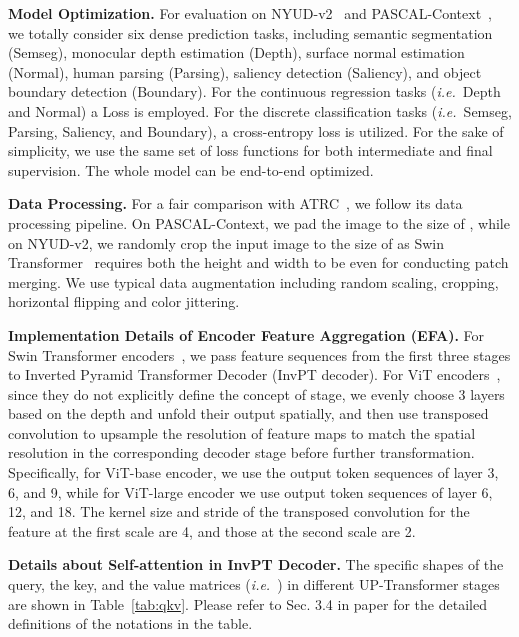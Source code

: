 \documentclass[runningheads]{llncs}
\newcommand*{\ie}{\emph{i.e.}}
\begin{document}
\par\noindent\textbf{Model Optimization.} For evaluation on NYUD-v2~\cite{silberman2012indoor} and PASCAL-Context~\cite{chen2014detect}, we totally consider six dense prediction tasks, including
semantic segmentation (Semseg), monocular depth estimation (Depth),  surface normal estimation (Normal), human parsing (Parsing), saliency detection (Saliency), and object boundary detection (Boundary).
For the continuous regression tasks (\ie~Depth and Normal)
a  Loss is employed. For the discrete classification tasks (\ie~Semseg, Parsing, Saliency, and Boundary), a cross-entropy loss is utilized.
For the sake of simplicity, we use the same set of loss functions for both intermediate and final supervision.
The whole model can be end-to-end optimized.


\par\noindent\textbf{Data Processing.} For a fair comparison with ATRC~\cite{atrc}, we follow its data processing pipeline. On PASCAL-Context, we pad the image to the size of , while on NYUD-v2, we randomly crop the input image to the size of  as Swin Transformer~\cite{swin} requires both the height and width to be even for conducting patch merging. We use typical data augmentation including random scaling, cropping, horizontal flipping and color jittering.

\par\noindent\textbf{Implementation Details of Encoder Feature Aggregation (EFA).}
For Swin Transformer encoders~\cite{swin}, we pass feature sequences from the first three stages to Inverted Pyramid Transformer Decoder (InvPT decoder).
For ViT encoders~\cite{vit}, since they do not explicitly define the concept of stage, we evenly choose 3 layers based on the depth and unfold their output spatially, and then use transposed convolution to upsample the resolution of feature maps to match the spatial resolution in the corresponding decoder stage before further transformation.
Specifically, for ViT-base encoder, we use the output token sequences of layer 3, 6, and 9, while for ViT-large encoder we use output token sequences of layer 6, 12, and 18.
The kernel size and stride of the transposed convolution for the feature at the first scale are 4, and those at the second scale are 2.

\par\noindent\textbf{Details about Self-attention in InvPT Decoder.} The specific shapes of the query, the key, and the value matrices (\ie~) in different UP-Transformer stages are shown in Table~\ref{tab:qkv}. Please refer to Sec. 3.4 in paper for the detailed definitions of the notations in the table.
\end{document}
